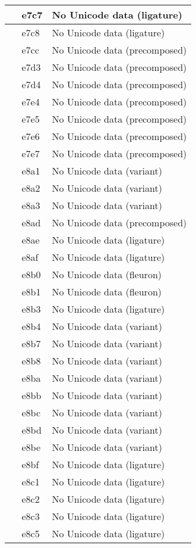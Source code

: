 \documentclass[12pt,letterpaper,openany]{book}
\begin{document}
\begin{center}
\begin{supertabular}{|m{0.25in}|m{0.5in}|m{4in}|}
 & e7c7 & No Unicode data (ligature)\\\hline
 & e7c8 & No Unicode data (ligature)\\\hline
 & e7cc & No Unicode data (precomposed)\\\hline
 & e7d3 & No Unicode data (precomposed)\\\hline
 & e7d4 & No Unicode data (precomposed)\\\hline
 & e7e4 & No Unicode data (precomposed)\\\hline
 & e7e5 & No Unicode data (precomposed)\\\hline
 & e7e6 & No Unicode data (precomposed)\\\hline
 & e7e7 & No Unicode data (precomposed)\\\hline
 & e8a1 & No Unicode data (variant)\\\hline
 & e8a2 & No Unicode data (variant)\\\hline
 & e8a3 & No Unicode data (variant)\\\hline
 & e8ad & No Unicode data (precomposed)\\\hline
 & e8ae & No Unicode data (ligature)\\\hline
 & e8af & No Unicode data  (ligature)\\\hline
 & e8b0 & No Unicode data (fleuron)\\\hline
 & e8b1 & No Unicode data (fleuron)\\\hline
 & e8b3 & No Unicode data (ligature)\\\hline
 & e8b4 & No Unicode data (variant)\\\hline
 & e8b7 & No Unicode data (variant)\\\hline
 & e8b8 & No Unicode data (variant)\\\hline
 & e8ba & No Unicode data (variant)\\\hline
 & e8bb & No Unicode data (variant)\\\hline
 & e8bc & No Unicode data (variant)\\\hline
 & e8bd & No Unicode data (variant)\\\hline
 & e8be & No Unicode data (variant)\\\hline
 & e8bf & No Unicode data (ligature)\\\hline
 & e8c1 & No Unicode data (ligature)\\\hline
 & e8c2 & No Unicode data (ligature)\\\hline
 & e8c3 & No Unicode data (ligature)\\\hline
 & e8c5 & No Unicode data (ligature)\\\hline

\end{supertabular}
\end{center}
\end{document}
